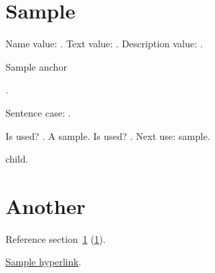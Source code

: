 \documentclass{article}
\begin{document}
\tableofcontents

\section{Sample}
\label{sec:sample}
Name value: .
Text value: .
Description value: .

\hypertarget{sampleanchor}{Sample anchor}.

Sentence case: .

Is used? .
A \gls{sample}.
Is used? .
Next use: \gls{sample}.

\Gls{child}.

\section{Another}
\label{sec:another}

Reference section~\ref{sec:sample} (\ref*{sec:sample}).

\hyperlink{sampleanchor}{Sample hyperlink}.

\printglossaries
\end{document}
